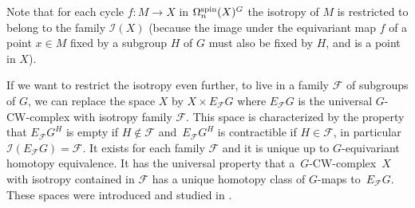 	\begin{Remark}
		Note that for each cycle $f\colon M\to X$ in $\Omega_n^{\rm spin}(X)^G$ the
		isotropy of $M$ is restricted to belong to the family $\mathcal{I}(X)$
		(because the image under the equivariant map $f$ of a point $x\in M$ fixed by a subgroup $H$ of
		$G$ must also be fixed by $H$, and is a point in $X$).
		
		If we want to restrict the isotropy even further, to live in a family
		$\mathcal{F}$ of subgroups of $G$, we can replace the space $X$ by $X\times
		E_{\mathcal{F}}G$ where $E_{\mathcal{F}}G$ is the universal $G$-CW-complex
		with isotropy family $\mathcal{F}$. This space is characterized by the property
		that $E_{\mathcal{F}}G^H$ is empty if $H\notin \mathcal{F}$ and~$E_{\mathcal{F}}G^H$ is contractible if $H\in\mathcal{F}$, in particular $\mathcal{I}(E_{\mathcal{F}}G)=\mathcal{F}$. It exists for
		each family $\mathcal{F}$ and it is unique up to $G$-equivariant homotopy
		equivalence. It has the universal property that a~$G$-CW-complex~$X$ with
		isotropy contained in $\mathcal{F}$ has a unique homotopy class of $G$-maps
		to~$E_{\mathcal{F}}G$. These spaces were introduced and studied in \cite{tomDieck,ttd}.
	\end{Remark}

